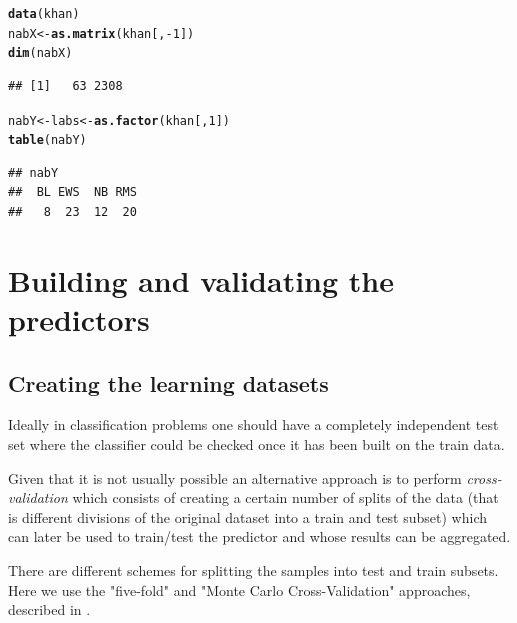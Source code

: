\documentclass{article}\usepackage[]{graphicx}\usepackage[]{color}
\makeatletter
\newcommand{\hlnum}[1]{\textcolor[rgb]{0.686,0.059,0.569}{#1}}%
\newcommand{\hlopt}[1]{\textcolor[rgb]{0,0,0}{#1}}%
\newcommand{\hlstd}[1]{\textcolor[rgb]{0.345,0.345,0.345}{#1}}%
\newcommand{\hlkwb}[1]{\textcolor[rgb]{0.69,0.353,0.396}{#1}}%
\newcommand{\hlkwd}[1]{\textcolor[rgb]{0.737,0.353,0.396}{\textbf{#1}}}%
\newenvironment{kframe}{%
 \def\at@end@of@kframe{}%
 \ifinner\ifhmode%
  \def\at@end@of@kframe{\end{minipage}}%
  \begin{minipage}{\columnwidth}%
 \fi\fi%
 \def\FrameCommand##1{\hskip\@totalleftmargin \hskip-\fboxsep
 \colorbox{shadecolor}{##1}\hskip-\fboxsep
     \hskip-\linewidth \hskip-\@totalleftmargin \hskip\columnwidth}%
 \MakeFramed {\advance\hsize-\width
   \@totalleftmargin\z@ \linewidth\hsize
   \@setminipage}}%
 {\par\unskip\endMakeFramed%
 \at@end@of@kframe}
\newenvironment{knitrout}{}{} %
\makeatother
\begin{document}
\begin{knitrout}
\begin{kframe}
{\ttfamily\noindent\itshape{}}\begin{alltt}
\hlkwd{data}\hlstd{(khan)}
\hlstd{nabX} \hlkwb{<-} \hlkwd{as.matrix}\hlstd{(khan[,}\hlopt{-}\hlnum{1}\hlstd{])}
\hlkwd{dim}\hlstd{(nabX)}
\end{alltt}
\begin{verbatim}
## [1]   63 2308
\end{verbatim}
\begin{alltt}
\hlstd{nabY} \hlkwb{<-} \hlstd{labs}\hlkwb{<-}\hlkwd{as.factor}\hlstd{(khan[,}\hlnum{1}\hlstd{])}
\hlkwd{table}\hlstd{(nabY)}
\end{alltt}
\begin{verbatim}
## nabY
##  BL EWS  NB RMS 
##   8  23  12  20
\end{verbatim}
\end{kframe}
\end{knitrout}

\section{Building and validating the predictors}

\subsection{Creating the learning datasets}

Ideally in classification problems one should have a completely independent test set where the classifier could be checked once it has been built on the train data. 

Given that it is not usually possible an alternative approach is to perform \emph{cross-validation} which consists of creating a certain number of splits of the data (that is different divisions of the original dataset into a train and test subset) which can later be used to train/test the predictor and whose results can be aggregated.

There are different schemes for splitting the samples into test and train subsets. Here we use  the "five-fold" and "Monte Carlo Cross-Validation" approaches, described in \cite{CMAvignette}.
\end{document}
